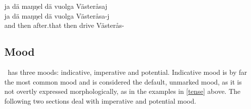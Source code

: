 \z
\ea\label{presentEx3}%
\glll	ja dä maŋŋel dä vuolga Västeråsaj\\
	ja dä maŋŋel dä vuolga Västeråsa-j\\
	and then after.that then drive\BS{} Västerås-\\\nopagebreak
{}	
\z
{}


\subsection{Mood}\label{mood}
\PS\ has three moods: indicative, imperative and potential. Indicative mood is by far the most common mood and is considered the default, unmarked mood, as it is not overtly expressed morphologically, as in the examples in \SEC\ref{tense} above. 
The following two sections deal with imperative and potential mood. %

